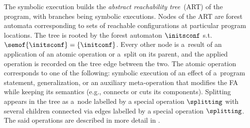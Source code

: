 %
%
%
The symbolic execution builds the
\emph{abstract reachability tree}~(ART) of the program, with branches being symbolic executions.
Nodes of the ART are forest automata corresponding to sets of reachable configurations
at particular program locations.
The tree is rooted by the forest automaton $\initsconf$ s.t. $\semof{\initsconf} = \{\initconf\}$. 
Every other node is a~result of an application of an atomic operation or
a~split on its parent,
and the applied operation is recorded on the tree edge between the two.
The atomic operation corresponds to one of the following: symbolic execution of an effect of
a~program statement, generalization, or an auxiliary meta-operation that modifies
the FA while keeping its semantics (e.g., connects or cuts its components).
Splitting appears in the tree as a~node labelled by a special operation $\splitting$ with several children connected via edges labelled by a special operation $\splitting$. 
The said operations are described in more detail in .
%
%
%
%



